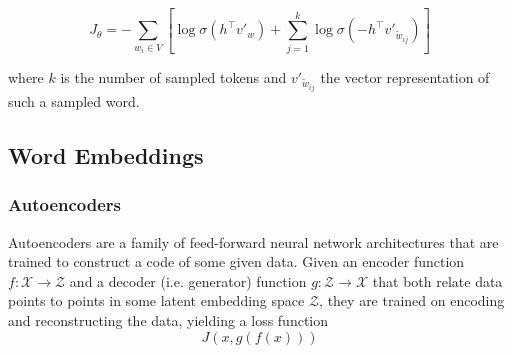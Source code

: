 \documentclass[6pt]{article}
\begin{document}
\begin{equation}
J_{\theta}  = - \sum_{w_i \in V} [\log \sigma(h^{\top}v'_w)
+ \sum_{j=1}^{k}\log \sigma(-h^{\top}v'_{\tilde{w}_{ij}})]
\label{eq:neg_sampling_3}
\end{equation}

\noindent where $k$ is the number of sampled tokens and $v'_{\tilde{w}_{ij}}$ the vector representation of such a sampled word.



\subsection{Word Embeddings}
\label{Word Embeddings}
\subsubsection{Autoencoders}

Autoencoders are a family of feed-forward neural network architectures that are trained to construct a code of some given data. Given an encoder function $f: \mathcal{X} \rightarrow \mathcal{Z}$ and a decoder (i.e. generator) function $g: \mathcal{Z} \rightarrow \mathcal{X}$ that both relate data points to points in some latent embedding space $\mathcal{Z}$, they are trained on encoding and reconstructing the data, yielding a loss function
\begin{equation}
J(x,g(f(x)))
\end{equation}
 
\end{document}
